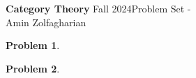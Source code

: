 \documentclass[12pt]{article}
\newcommand{\customanswer}[1]{%
\begin{problem}
    
\end{problem}

}
\newtheorem{problem}{Problem}
\begin{document}
\noindent \textbf{Category Theory} Fall 2024\hfill Problem Set -\\
Amin Zolfagharian

\hrulefill

\customanswer{1}
\customanswer{2}
\end{document}
